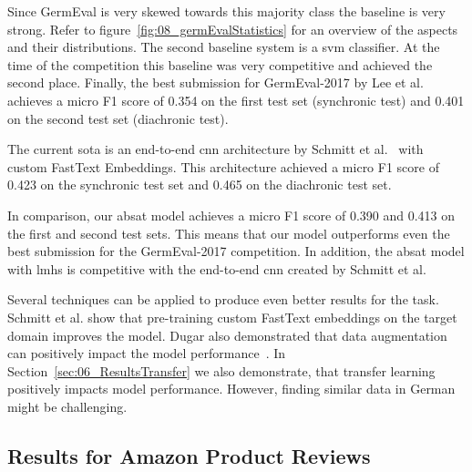 Since GermEval is very skewed towards this majority class the baseline is very strong. Refer to figure~\ref{fig:08_germEvalStatistics} for an overview of the aspects and their distributions. The second baseline system is a \gls{svm} classifier. At the time of the competition this baseline was very competitive and achieved the second place. Finally, the best submission for GermEval-2017 by Lee et al. achieves a micro F1 score of 0.354 on the first test set {(synchronic test)} and 0.401 on the second test set {(diachronic test)}.
\medskip

The current \acrfull{sota} is an end-to-end \gls{cnn} architecture by Schmitt et al.~\cite{Schmitt2018} with custom FastText Embeddings. This architecture achieved a micro F1 score of 0.423 on the synchronic test set and 0.465 on the diachronic test set. 
\medskip

In comparison, our \gls{absat} model achieves a micro F1 score of 0.390 and 0.413 on the first and second test sets. This means that our model outperforms even the best submission for the GermEval-2017 competition. In addition, the \gls{absat} model with \glspl{lmh} is competitive with the end-to-end \gls{cnn} created by Schmitt et al.
\medskip

Several techniques can be applied to produce even better results for the task. Schmitt et al. show that pre-training custom FastText embeddings on the target domain improves the model. Dugar also demonstrated that data augmentation can positively impact the model performance~\cite{Dugar2019}. 
\smallskip
In Section~\ref{sec:06_ResultsTransfer} we also demonstrate, that transfer learning positively impacts model performance. However, finding similar data in German might be challenging.

\subsection{Results for Amazon Product Reviews}
\label{sec:06_ResultsAmazon}

